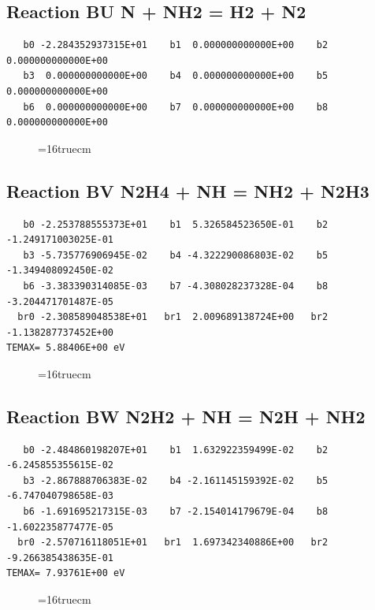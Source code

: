 \documentclass[12pt,dvipdfm]{article}
\begin{document}
\subsection{
Reaction BU N + NH2 = H2 + N2 }
\begin{small}\begin{verbatim}
   b0 -2.284352937315E+01    b1  0.000000000000E+00    b2  0.000000000000E+00
   b3  0.000000000000E+00    b4  0.000000000000E+00    b5  0.000000000000E+00
   b6  0.000000000000E+00    b7  0.000000000000E+00    b8  0.000000000000E+00
   \end{verbatim}\end{small}
\begin{figure}[h!]
\label{n2rates}
\epsfxsize=16truecm
\end{figure}
\newpage

\subsection{
Reaction BV N2H4 + NH = NH2 + N2H3 }
\begin{small}\begin{verbatim}
   b0 -2.253788555373E+01    b1  5.326584523650E-01    b2 -1.249171003025E-01
   b3 -5.735776906945E-02    b4 -4.322290086803E-02    b5 -1.349408092450E-02
   b6 -3.383390314085E-03    b7 -4.308028237328E-04    b8 -3.204471701487E-05
  br0 -2.308589048538E+01   br1  2.009689138724E+00   br2 -1.138287737452E+00
TEMAX= 5.88406E+00 eV
   \end{verbatim}\end{small}
\begin{figure}[h!]
\label{n2rates}
\epsfxsize=16truecm
\end{figure}
\newpage

\subsection{
Reaction BW N2H2 + NH = N2H + NH2 }
\begin{small}\begin{verbatim}
   b0 -2.484860198207E+01    b1  1.632922359499E-02    b2 -6.245855355615E-02
   b3 -2.867888706383E-02    b4 -2.161145159392E-02    b5 -6.747040798658E-03
   b6 -1.691695217315E-03    b7 -2.154014179679E-04    b8 -1.602235877477E-05
  br0 -2.570716118051E+01   br1  1.697342340886E+00   br2 -9.266385438635E-01
TEMAX= 7.93761E+00 eV
   \end{verbatim}\end{small}
\begin{figure}[h!]
\label{n2rates}
\epsfxsize=16truecm
\end{figure}
\newpage
\end{document}
